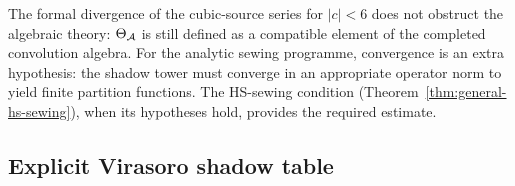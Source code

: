 \begin{remark}
The formal divergence of the cubic-source series for $|c| < 6$ does not
obstruct the algebraic theory: $\Theta_{\mathcal{A}}$ is still defined as a
compatible element of the completed convolution algebra. For the
analytic sewing programme, convergence is an extra hypothesis: the
shadow tower must converge in an appropriate operator norm to yield
finite partition functions. The HS-sewing condition
(Theorem~\ref{thm:general-hs-sewing}), when its hypotheses hold,
provides the required estimate.
\end{remark}


\subsection{Explicit Virasoro shadow table}

